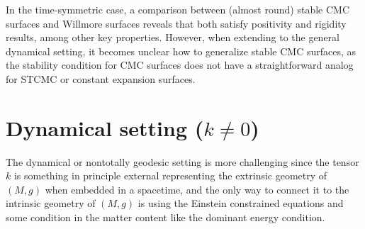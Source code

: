 \documentclass[12pt,a4paper]{amsart}
\theoremstyle{plain}
\theoremstyle{definition}
\begin{document}
In the time-symmetric case, a comparison between (almost round) stable CMC surfaces and Willmore surfaces reveals that both satisfy positivity and rigidity results, among other key properties. However, when extending to the general dynamical setting, it becomes unclear how to generalize stable CMC surfaces, as the stability condition for CMC surfaces does not have a straightforward analog for STCMC or constant expansion surfaces.

 


\section{Dynamical setting (\texorpdfstring{$k\neq 0$} )) }\label{sectiondyn}

 The dynamical or nontotally geodesic  setting is more challenging since the tensor $k$ is something in principle external representing the extrinsic geometry of $(M,g)$ when embedded in a spacetime, and the only way to connect it to the intrinsic geometry of $(M,g)$ is using the Einstein constrained equations and some condition in the matter content like the dominant energy condition.
\end{document}
